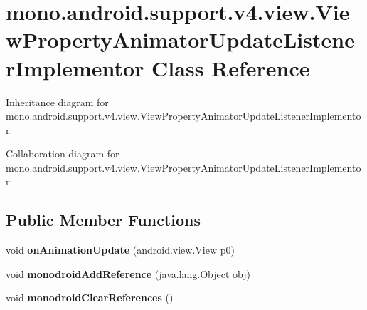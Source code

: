 \hypertarget{classmono_1_1android_1_1support_1_1v4_1_1view_1_1_view_property_animator_update_listener_implementor}{}\section{mono.\+android.\+support.\+v4.\+view.\+View\+Property\+Animator\+Update\+Listener\+Implementor Class Reference}
\label{classmono_1_1android_1_1support_1_1v4_1_1view_1_1_view_property_animator_update_listener_implementor}


Inheritance diagram for mono.\+android.\+support.\+v4.\+view.\+View\+Property\+Animator\+Update\+Listener\+Implementor\+:


Collaboration diagram for mono.\+android.\+support.\+v4.\+view.\+View\+Property\+Animator\+Update\+Listener\+Implementor\+:
\subsection*{Public Member Functions}
\begin{DoxyCompactItemize}
\item 
\mbox{\label{classmono_1_1android_1_1support_1_1v4_1_1view_1_1_view_property_animator_update_listener_implementor_a4d255e7a411646970a62e3fda262fc90}} 
void {\bfseries on\+Animation\+Update} (android.\+view.\+View p0)
\item 
\mbox{\label{classmono_1_1android_1_1support_1_1v4_1_1view_1_1_view_property_animator_update_listener_implementor_aab23a713316535ff467814de0a1d96b1}} 
void {\bfseries monodroid\+Add\+Reference} (java.\+lang.\+Object obj)
\item 
\mbox{\label{classmono_1_1android_1_1support_1_1v4_1_1view_1_1_view_property_animator_update_listener_implementor_a0279030b5e11e7f78669ad7a2a033d8b}} 
void {\bfseries monodroid\+Clear\+References} ()
\end{DoxyCompactItemize}
